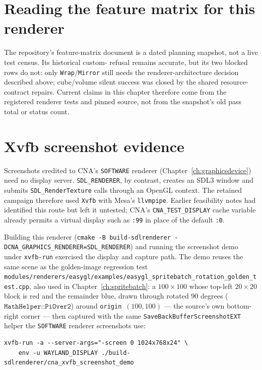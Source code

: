 \section{Reading the feature matrix for this renderer}

The repository's feature-matrix document is a dated planning snapshot, not a live test census.
Its historical custom- refusal remains accurate, but its two blocked rows do
not: only \texttt{Wrap}/\texttt{Mirror} still needs the renderer-architecture decision described
above; cube/volume silent success was closed by the shared resource-contract repairs. Current
claims in this chapter therefore come from the registered renderer tests and pinned source, not
from the snapshot's old pass total or status count.

\section{Xvfb screenshot evidence}

Screenshots credited to CNA's \texttt{SOFTWARE} renderer (Chapter~\ref{ch:graphicsdevice}) need
no display server. \texttt{SDL\_RENDERER}, by contrast, creates an SDL3 window and submits
\texttt{SDL\_RenderTexture} calls through an OpenGL context. The retained campaign therefore
used \texttt{Xvfb} with Mesa's \texttt{llvmpipe}. Earlier feasibility notes had identified this
route but left it untested; CNA's \texttt{CNA\_TEST\_DISPLAY} cache variable already permits a
virtual display such as \texttt{:99} in place of the default \texttt{:0}.

Building this renderer (\texttt{cmake -B build-sdlrenderer -DCNA\_GRAPHICS\_RENDERER=SDL\_RENDERER})
and running the screenshot demo under \texttt{xvfb-run} exercised the display and capture path.
The demo reuses the same scene as the golden-image regression test
\texttt{modules/renderers/easygl/examples/\allowbreak{}easygl\_spritebatch\_rotation\_golden\_test.cpp},
also used in Chapter~\ref{ch:spritebatch}: a
$100\times100$  whose top-left $20\times20$ block is red and the remainder
blue, drawn through  rotated $90$ degrees ($\texttt{MathHelper::PiOver2}$)
around \texttt{origin}~$(100,100)$ --- the source's own bottom-right corner --- then captured
with the same \texttt{SaveBackBufferScreenshotEXT} helper the \texttt{SOFTWARE} renderer
screenshots use:

\begin{lstlisting}
xvfb-run -a --server-args="-screen 0 1024x768x24" \
    env -u WAYLAND_DISPLAY ./build-sdlrenderer/cna_xvfb_screenshot_demo
\end{lstlisting}

